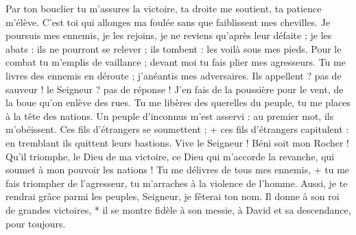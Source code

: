 Par ton bouclier tu m'assures la victoire, ta droite me soutient, ta patience m'élève.
\versseparator
C'est toi qui allonges ma foulée sans que faiblissent mes chevilles.
\versseparator
Je poursuis mes ennemis, je les rejoins, je ne reviens qu'après leur défaite ;
\versseparator
je les abats : ils ne pourront se relever ; ils tombent : les voilà sous mes pieds.
\versseparator
Pour le combat tu m'emplis de vaillance ; devant moi tu fais plier mes agresseurs.
\versseparator
Tu me livres des ennemis en déroute ; j'anéantis mes adversaires.
\versseparator
Ils appellent ? pas de sauveur ! le Seigneur ? pas de réponse !
\versseparator
J'en fais de la poussière pour le vent, de la boue qu'on enlève des rues.
\versseparator
Tu me libères des querelles du peuple, tu me places à la tête des nations. Un peuple d'inconnus m'est asservi :
\versseparator
au premier mot, ils m'obéissent. Ces fils d'étrangers se soumettent ; +
\versseparator
ces fils d'étrangers capitulent : en tremblant ils quittent leurs bastions.
\versseparator
Vive le Seigneur ! Béni soit mon Rocher ! Qu'il triomphe, le Dieu de ma victoire,
\versseparator
ce Dieu qui m'accorde la revanche, qui soumet à mon pouvoir les nations !
\versseparator
Tu me délivres de tous mes ennemis, + tu me fais triompher de l'agresseur, tu m'arraches à la violence de l'homme.
\versseparator
Aussi, je te rendrai grâce parmi les peuples, Seigneur, je fêterai ton nom.
\versseparator
Il donne à son roi de grandes victoires, * il se montre fidèle à son messie, à David et sa descendance, pour toujours.
